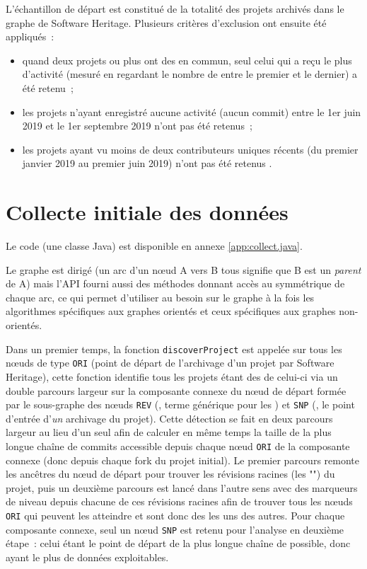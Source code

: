 L'échantillon de départ est constitué de la totalité des projets archivés dans le graphe de Software Heritage.
Plusieurs critères d'exclusion ont ensuite été appliqués :

\begin{itemize}
    \item quand deux projets ou plus ont des  en commun, seul celui qui a reçu le plus
        d'activité (mesuré en regardant le nombre de  entre le premier et le dernier) a été
        retenu ;
    \item les projets n'ayant enregistré aucune activité (aucun commit) entre le 1er juin 2019 et le 1er
        septembre 2019 n'ont pas été retenus ;
    \item les projets ayant vu moins de deux contributeurs uniques récents (du premier janvier 2019 au premier
        juin 2019) n'ont pas été retenus \parencite[voir][]{mining-github-2014}.
\end{itemize}

\section{Collecte initiale des données}


Le code (une classe Java) est disponible en annexe \ref{app:collect.java}.

Le graphe est dirigé (un arc d'un nœud A vers B tous signifie que B est un  \emph{parent} de A)
mais l'API fourni aussi des méthodes donnant accès au symmétrique de chaque arc, ce qui permet d'utiliser au
besoin sur le graphe à la fois les algorithmes spécifiques aux graphes orientés et ceux spécifiques aux
graphes non-orientés.

Dans un premier temps, la fonction \texttt{discoverProject} est appelée sur tous les nœuds de type
\texttt{ORI} (point de départ de l'archivage d'un projet par Software Heritage), cette fonction identifie tous
les projets étant des  de celui-ci via un double parcours largeur sur la composante connexe du nœud
de départ formée par le sous-graphe des nœuds \texttt{REV} (, terme générique pour les
) et \texttt{SNP} (, le point d'entrée d'\emph{un} archivage du projet). Cette
détection se fait en deux parcours largeur au lieu d'un seul afin de calculer en même temps la taille de la
plus longue chaîne de commits accessible depuis chaque nœud \texttt{ORI} de la composante connexe (donc depuis
chaque fork du projet initial). Le premier parcours remonte les ancêtres du nœud de départ pour trouver les
révisions racines (les "") du projet, puis un deuxième parcours est lancé dans l'autre
sens avec des marqueurs de niveau depuis chacune de ces révisions racines afin de trouver tous les nœuds
\texttt{ORI} qui peuvent les atteindre et sont donc des  les uns des autres. Pour chaque composante
connexe, seul un nœud \texttt{SNP} est retenu pour l'analyse en deuxième étape : celui étant le point de
départ de la plus longue chaîne de  possible, donc ayant le plus de données exploitables.

